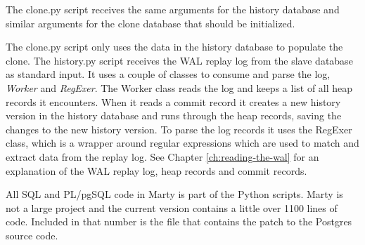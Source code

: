 The clone.py script receives the same arguments for the history database and similar arguments for the clone database that should be initialized.

The clone.py script only uses the data in the history database to populate the clone.
The history.py script receives the WAL replay log from the slave database as standard input.
It uses a couple of classes to consume and parse the log, \textit{Worker} and \textit{RegExer}.
The Worker class reads the log and keeps a list of all heap records it encounters.
When it reads a commit record it creates a new history version in the history database and runs through the heap records, saving the changes to the new history version.
To parse the log records it uses the RegExer class, which is a wrapper around regular expressions which are used to match and extract data from the replay log.
See Chapter \ref{ch:reading-the-wal} for an explanation of the WAL replay log, heap records and commit records.

All SQL and PL/pgSQL code in Marty is part of the Python scripts.
Marty is not a large project and the current version contains a little over 1100 lines of code.
Included in that number is the file that contains the patch to the Postgres source code.